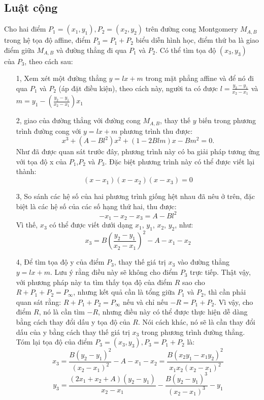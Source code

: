 \documentclass[a4paper,12pt]{report}
\begin{document}
\subsection*{Luật cộng}
Cho hai điểm $P_{1} = (x_{1}, y_{1}), P_{2}=(x_{2},y_{2})$ trên đường cong Montgomery $M_{A, B}$ trong hệ tọa độ affine, điểm $P_{3} = P_{1} + P_{2}$ biểu diễn hình học, điểm thứ ba là giao điểm giữa $M_{A, B}$ và đường thẳng đi qua $P_{1}$ và $P_{2}$. Có thể tìm tọa độ $(x_3, y_3)$ của $P_{3}$, theo cách sau:
\begin{itemize}
\item[1, ] Xem xét một đường thẳng $y = lx + m$ trong mặt phẳng affine và để nó đi qua $P_{1}$ và $P_{2}$ (áp đặt điều kiện), theo cách này, người ta có được $\displaystyle{l = \frac {y_{2} - y_{1}}{x_{2} - x_{1}}}$ và $\displaystyle{m = y_ {1} - \left({\frac {y_ {2} -y_ {1}} {x_ {2} -x_ {1}}} \right)x_{1}}$
\item[2, ] giao của đường thẳng với đường cong $M_{A, B}$, thay thế $y$ biến trong phương trình đường cong với $y = lx + m$ phương trình thu được:
\begin{displaymath}
x^3 + (A - Bl^2)x^2 + (1 - 2Blm)x - Bm^2 = 0.
\end{displaymath}
Như đã được quan sát trước đây, phương trình này có ba giải pháp tương ứng với tọa độ x của $P_{1}$,$P_{2}$ và $P_{3}$. Đặc biệt phương trình này có thể được viết lại thành:
\begin{displaymath}
(x - x_1)(x - x_2)(x - x_3) = 0
\end{displaymath}
\item[3, ] So sánh các hệ số của hai phương trình giống hệt nhau đã nêu ở trên, đặc biệt là các hệ số của các số hạng thứ hai, thu được:
\begin{displaymath}
-x_1 - x_2 - x_3 = A - Bl^2
\end{displaymath}
Vì thế, $x_3$ có thể được viết dưới dạng $x_{1}$, $y_{1}$, $x_{2}$, $y_{2}$, như:
\begin{displaymath}
x_3 = B\left(\frac{y_2 - y_1}{x_2 - x_1} \right)^2 - A - x_1 - x_2
\end{displaymath}
\item[4, ] Để tìm tọa độ y của điểm $P_{3}$, thay thế giá trị $x_{3}$ vào đường thẳng $y = lx + m$. Lưu ý rằng điều này sẽ không cho điểm $P_{3}$ trực tiếp. Thật vậy, với phương pháp này ta tìm thấy tọa độ của điểm $R$ sao cho $R + P_1 + P_2 = P_\infty$, nhưng  kết quả cần là tổng giữa $P_{1}$ và $P_{2}$, thì cần phải quan sát rằng: $R + P_1 + P_2 = P_\infty$ nếu và chỉ nếu $-R = P_1 + P_2$. Vì vậy, cho điểm $R$, nó là cần tìm $-R$, nhưng điều này có thể được thực hiện dễ dàng bằng cách thay đổi dấu y tọa độ của $R$. Nói cách khác, nó sẽ là cần thay đổi dấu của y bằng cách thay thế giá trị  $x_{3}$ trong phương trình đường thẳng.
Tóm lại tọa độ của điểm $P_3 = (x_3, y_3), P_3 = P_1 + P_2$ là:
\begin{displaymath}
x_3 = \frac{B(y_2-y_1)^2}{(x_2-x_1)^2}-A-x_1-x_2=\frac{B(x_2y_1-x_1y_2)^2}{x_1x_2(x_2-x_1)^2}
\end{displaymath}
\begin{displaymath}
y_3 = \frac{(2x_1+x_2+A)(y_2-y_1)}{x_2-x_1}-\frac{B(y_2-y_1)^3}{(x_2-x_1)^3}-y_1
\end{displaymath}
\end{itemize}
\end{document}
